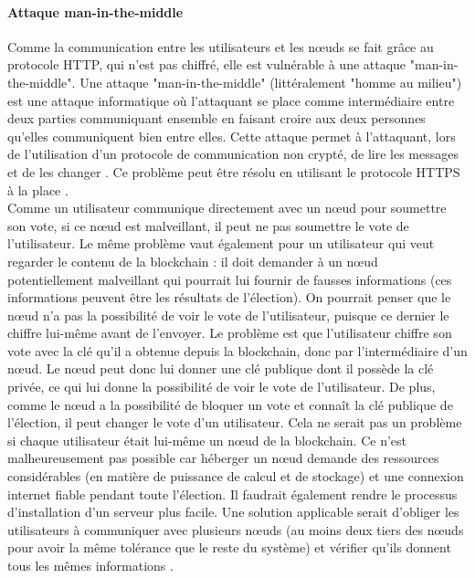 \documentclass[10pt,a4paper,twoside]{article}
\numberwithin{equation}{section}
\begin{document}
		\paragraph{Attaque man-in-the-middle}
			Comme la communication entre les utilisateurs et les n\oe uds se fait grâce au protocole HTTP, qui n'est pas chiffré, elle est vulnérable à une attaque "man-in-the-middle". Une attaque "man-in-the-middle" (littéralement "homme au milieu") est une attaque informatique où l'attaquant se place comme intermédiaire entre deux parties communiquant ensemble en faisant croire aux deux personnes qu'elles communiquent bien entre elles. Cette attaque permet à l'attaquant, lors de l'utilisation d'un protocole de communication non crypté, de lire les messages et de les changer \cite{wiki:mitm}. Ce problème peut être résolu en utilisant le protocole HTTPS à la place \cite{evoting_dela}.\\
			
		Comme un utilisateur communique directement avec un n\oe ud pour soumettre son vote, si ce n\oe ud est malveillant, il peut ne pas soumettre le vote de l'utilisateur. Le même problème vaut également pour un utilisateur qui veut regarder le contenu de la blockchain : il doit demander à un n\oe ud potentiellement malveillant qui pourrait lui fournir de fausses informations (ces informations peuvent être les résultats de l'élection). On pourrait penser que le n\oe ud n'a pas la possibilité de voir le vote de l'utilisateur, puisque ce dernier le chiffre lui-même avant de l'envoyer. Le problème est que l'utilisateur chiffre son vote avec la clé qu'il a obtenue depuis la blockchain, donc par l'intermédiaire d'un n\oe ud. Le n\oe ud peut donc lui donner une clé publique dont il possède la clé privée, ce qui lui donne la possibilité de voir le vote de l'utilisateur. De plus, comme le n\oe ud a la possibilité de bloquer un vote et connaît la clé publique de l'élection, il peut changer le vote d'un utilisateur. Cela ne serait pas un problème si chaque utilisateur était lui-même un n\oe ud de la blockchain. Ce n'est malheureusement pas possible car héberger un n\oe ud demande des ressources considérables (en matière de puissance de calcul et de stockage) et une connexion internet fiable pendant toute l'élection. Il faudrait également rendre le processus d'installation d'un serveur plus facile. Une solution applicable serait d'obliger les utilisateurs à communiquer avec plusieurs n\oe uds (au moins deux tiers des n\oe uds pour avoir la même tolérance que le reste du système) et vérifier qu'ils donnent tous les mêmes informations \cite{evoting_dela}.\\
		
\end{document}
